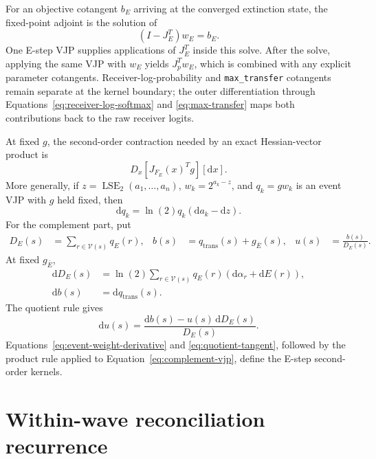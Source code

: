 \documentclass[11pt]{article}
\newcommand{\LSE}{\operatorname{LSE}_2}
\newcommand{\dd}{\mathrm{d}}
\begin{document}
For an objective cotangent $b_E$ arriving at the converged extinction state,
the fixed-point adjoint is the solution of
\begin{equation}
  (I-J_E^T)w_E=b_E.
  \label{eq:e-adjoint-fixed-point}
\end{equation}
One E-step VJP supplies applications of $J_E^T$ inside this solve.  After the
solve, applying the same VJP with $w_E$ yields $J_p^T w_E$, which is combined
with any explicit parameter cotangents.  Receiver-log-probability and
\texttt{max\_transfer} cotangents remain separate at the kernel boundary; the
outer differentiation through Equations~\eqref{eq:receiver-log-softmax} and
\eqref{eq:max-transfer} maps both contributions back to the raw receiver
logits.

At fixed $g$, the second-order contraction needed by an exact
Hessian-vector product is
\begin{equation}
  D_x[J_{F_E}(x)^Tg][\dd x].
  \label{eq:e-so}
\end{equation}
More generally, if $z=\LSE(a_1,\ldots,a_n)$, $w_k=2^{a_k-z}$, and
$q_k=g w_k$ is an event VJP with $g$ held fixed, then
\begin{equation}
  \dd q_k=\ln(2)q_k(\dd a_k-\dd z).
  \label{eq:event-weight-derivative}
\end{equation}
For the complement part, put
\begin{align}
  D_E(s)&=\sum_{r\in\mathcal V(s)}q_E(r), &
  b(s)&=q_{\mathrm{trans}}(s)+g_{\bar E}(s), &
  u(s)&=\frac{b(s)}{D_E(s)}.
\end{align}
At fixed $g_{\bar E}$,
\begin{align}
  \dd D_E(s)
    &=\ln(2)\sum_{r\in\mathcal V(s)}q_E(r)
      (\dd\alpha_r+\dd E(r)), \\
  \dd b(s)&=\dd q_{\mathrm{trans}}(s).
\end{align}
The quotient rule gives
\begin{equation}
  \dd u(s)=\frac{\dd b(s)-u(s)\,\dd D_E(s)}{D_E(s)}.
  \label{eq:quotient-tangent}
\end{equation}
Equations~\eqref{eq:event-weight-derivative} and
\eqref{eq:quotient-tangent}, followed by the product rule applied to
Equation~\eqref{eq:complement-vjp}, define the E-step second-order kernels.

\section{Within-wave reconciliation recurrence}
\end{document}
